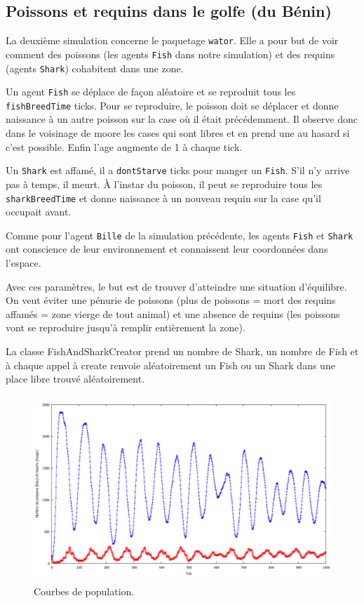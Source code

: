 \documentclass[a4paper]{article}
\begin{document}
\subsection{Poissons et requins dans le golfe (du Bénin)}
La deuxième simulation concerne le paquetage \texttt{wator}. Elle a pour but de voir comment des poissons (les agents \texttt{Fish} dans notre simulation) et des requins (agents \texttt{Shark}) cohabitent dans une zone. 

\medskip
Un agent \texttt{Fish} se déplace de façon aléatoire et se reproduit tous les \texttt{fishBreedTime} ticks. Pour se reproduire, le poisson doit se déplacer et donne naissance à un autre poisson sur la case où il était précédemment. Il observe donc dans le voisinage de moore les cases qui sont libres et en prend une au hasard si c'est possible. Enfin l'age augmente de 1 à chaque tick.

\medskip
Un \texttt{Shark} est affamé, il a \texttt{dontStarve} ticks pour manger un \texttt{Fish}. S'il n'y arrive pas à temps, il meurt. À l'instar du poisson, il peut se reproduire tous les \texttt{sharkBreedTime} et donne naissance à un nouveau requin sur la case qu'il occupait avant.

\medskip
Comme pour l'agent \texttt{Bille} de la simulation précédente, les agents \texttt{Fish} et \texttt{Shark} ont conscience de leur environnement et connaissent leur coordonnées dans l'espace.

\medskip
Avec ces paramètres, le but est de trouver d'atteindre une situation d'équilibre. On veut éviter une pénurie de poissons (plus de poissons = mort des requins affamés = zone vierge de tout animal) et une absence de requins (les poissons vont se reproduire jusqu'à remplir entièrement la zone).

\medskip
La classe FishAndSharkCreator prend un nombre de Shark, un nombre de Fish et à chaque appel à create renvoie aléatoirement un Fish ou un Shark dans une place libre trouvé aléatoirement.
 
\begin{figure}[!h]
\centering
\includegraphics[height=7cm]{1000tours.png}
\caption{Courbes de population.}
\end{figure}
\end{document}
